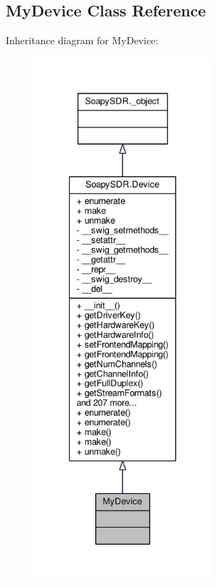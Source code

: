 \subsection{My\+Device Class Reference}
\label{classMyDevice}


Inheritance diagram for My\+Device\+:
\nopagebreak
\begin{figure}[H]
\begin{center}
\leavevmode
\includegraphics[height=550pt]{db/d3a/classMyDevice__inherit__graph}
\end{center}
\end{figure}


